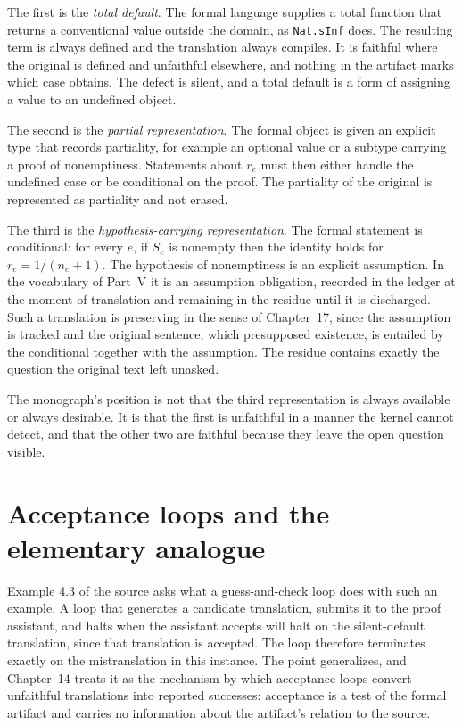 The first is the \emph{total default}. The formal language supplies a total function that returns a conventional value outside the domain, as \texttt{Nat.sInf} does. The resulting term is always defined and the translation always compiles. It is faithful where the original is defined and unfaithful elsewhere, and nothing in the artifact marks which case obtains. The defect is silent, and a total default is a form of assigning a value to an undefined object.

The second is the \emph{partial representation}. The formal object is given an explicit type that records partiality, for example an optional value or a subtype carrying a proof of nonemptiness. Statements about $r_e$ must then either handle the undefined case or be conditional on the proof. The partiality of the original is represented as partiality and not erased.

The third is the \emph{hypothesis-carrying representation}. The formal statement is conditional: for every $e$, if $S_e$ is nonempty then the identity holds for $r_e = 1/(n_e+1)$. The hypothesis of nonemptiness is an explicit assumption. In the vocabulary of Part~V it is an assumption obligation, recorded in the ledger at the moment of translation and remaining in the residue until it is discharged. Such a translation is preserving in the sense of Chapter~17, since the assumption is tracked and the original sentence, which presupposed existence, is entailed by the conditional together with the assumption. The residue contains exactly the question the original text left unasked.

The monograph's position is not that the third representation is always available or always desirable. It is that the first is unfaithful in a manner the kernel cannot detect, and that the other two are faithful because they leave the open question visible.

\section{Acceptance loops and the elementary analogue}

Example 4.3 of the source asks what a guess-and-check loop does with such an example. A loop that generates a candidate translation, submits it to the proof assistant, and halts when the assistant accepts will halt on the silent-default translation, since that translation is accepted. The loop therefore terminates exactly on the mistranslation in this instance. The point generalizes, and Chapter~14 treats it as the mechanism by which acceptance loops convert unfaithful translations into reported successes: acceptance is a test of the formal artifact and carries no information about the artifact's relation to the source.

